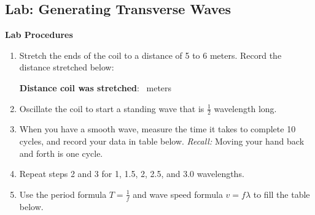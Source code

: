 \documentclass[]{exam}
\begin{document}
\subsection*{Lab: Generating Transverse Waves}




\medskip

\begin{mdframed}
\centering
\textbf{Lab Procedures}
\smallskip

\begin{enumerate}[itemsep=0pt,topsep=0pt]
    \item Stretch the ends of the coil to a distance of 5 to 6 meters. Record the distance stretched below:

    \begin{center}
        \textbf{Distance coil was stretched}: \fillin[5.0]\ meters
    \end{center}
    
    \item Oscillate the coil to start a standing wave that is $\frac{1}{2}$ wavelength long.
    \item When you have a smooth wave, measure the time it takes to complete 10 cycles, and record your data in table below. \textit{Recall:} Moving your hand back and forth is one cycle. 
    \item Repeat steps 2 and 3 for 1, 1.5, 2, 2.5, and 3.0 wavelengths.
    \item Use the period formula $T = \frac{1}{f}$ and wave speed formula $v = f \lambda$ to fill the table below.
\end{enumerate}
\end{mdframed}

\ifprintanswers
\end{document}
